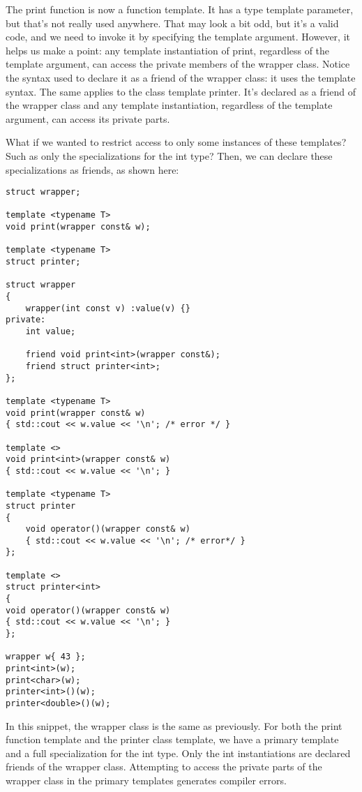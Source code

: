 The print function is now a function template. It has a type template parameter, but that’s not really used anywhere. That may look a bit odd, but it’s a valid code, and we need to invoke it by specifying the template argument. However, it helps us make a point: any template instantiation of print, regardless of the template argument, can access the private members of the wrapper class. Notice the syntax used to declare it as a friend of the wrapper class: it uses the template syntax. The same applies to the class template printer. It’s declared as a friend of the wrapper class and any template instantiation, regardless of the template argument, can access its private parts.

What if we wanted to restrict access to only some instances of these templates? Such as only the specializations for the int type? Then, we can declare these specializations as friends, as shown here:

\begin{lstlisting}[style=styleCXX]
struct wrapper;

template <typename T>
void print(wrapper const& w);

template <typename T>
struct printer;

struct wrapper
{
	wrapper(int const v) :value(v) {}
private:
	int value;
	
	friend void print<int>(wrapper const&);
	friend struct printer<int>;
};

template <typename T>
void print(wrapper const& w)
{ std::cout << w.value << '\n'; /* error */ }

template <>
void print<int>(wrapper const& w)
{ std::cout << w.value << '\n'; }

template <typename T>
struct printer
{
	void operator()(wrapper const& w)
	{ std::cout << w.value << '\n'; /* error*/ }
};

template <>
struct printer<int>
{
void operator()(wrapper const& w)
{ std::cout << w.value << '\n'; }
};

wrapper w{ 43 };
print<int>(w);
print<char>(w);
printer<int>()(w);
printer<double>()(w);
\end{lstlisting}

In this snippet, the wrapper class is the same as previously. For both the print function template and the printer class template, we have a primary template and a full specialization for the int type. Only the int instantiations are declared friends of the wrapper class. Attempting to access the private parts of the wrapper class in the primary templates generates compiler errors.

